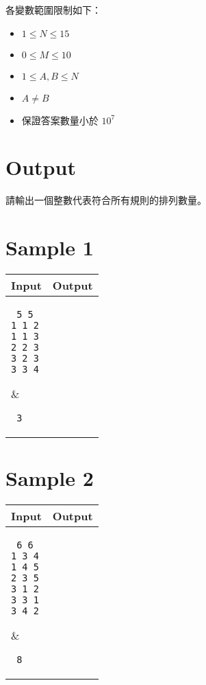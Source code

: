 \documentclass[11pt,a4paper]{article}
\begin{document}
\newpage
各變數範圍限制如下：
\begin{itemize}
    \item $1 \le N \le 15$
    \item $0 \le M \le 10$
    \item $1 \le A, B \le N$
    \item $A \neq B$
    \item 保證答案數量小於 $10^7$
\end{itemize}

\section*{Output}

請輸出一個整數代表符合所有規則的排列數量。

\section*{Sample 1}
\begin{longtable}[!h]{|p{}|p{}|}
\hline
\textbf {Input}	& \textbf {Output} \\
\hline
\parbox[t]{0.5\textwidth} %
{ \tt
5 5 \\
1 1 2 \\ 
1 1 3 \\ 
2 2 3 \\
3 2 3 \\
3 3 4 \\
} &
\parbox[t]{0.5\textwidth}
{ \tt
3 \\
} \\
\hline
\end{longtable}

\section*{Sample 2}
\begin{longtable}[!h]{|p{}|p{}|}
\hline
\textbf {Input}	& \textbf {Output} \\
\hline
\parbox[t]{0.5\textwidth} %
{ \tt
6 6 \\
1 3 4 \\
1 4 5 \\
2 3 5 \\
3 1 2 \\
3 3 1 \\
3 4 2 \\
} &
\parbox[t]{0.5\textwidth}
{ \tt
8 \\
} \\
\hline
\end{longtable}
\end{document}
